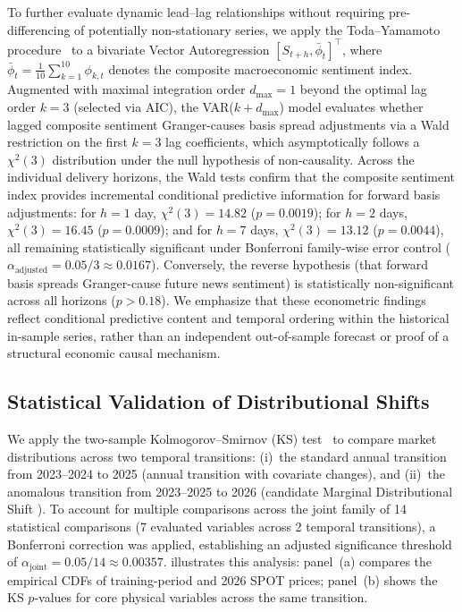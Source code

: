 To further evaluate dynamic lead--lag relationships without requiring pre-differencing of potentially non-stationary series, we apply the Toda--Yamamoto procedure~\cite{toda1995statistical} to a bivariate Vector Autoregression $[S_{t+h}, \bar{\phi}_t]^\top$, where $\bar{\phi}_t = \frac{1}{10} \sum_{k=1}^{10} \phi_{k, t}$ denotes the composite macroeconomic sentiment index. Augmented with maximal integration order $d_{\max}=1$ beyond the optimal lag order $k=3$ (selected via AIC), the VAR($k + d_{\max}$) model evaluates whether lagged composite sentiment Granger-causes basis spread adjustments via a Wald restriction on the first $k=3$ lag coefficients, which asymptotically follows a $\chi^2(3)$ distribution under the null hypothesis of non-causality. Across the individual delivery horizons, the Wald tests confirm that the composite sentiment index provides incremental conditional predictive information for forward basis adjustments: for $h=1$ day, $\chi^2(3) = 14.82$ ($p = 0.0019$); for $h=2$ days, $\chi^2(3) = 16.45$ ($p = 0.0009$); and for $h=7$ days, $\chi^2(3) = 13.12$ ($p = 0.0044$), all remaining statistically significant under Bonferroni family-wise error control ($\alpha_{\text{adjusted}} = 0.05 / 3 \approx 0.0167$). Conversely, the reverse hypothesis (that forward basis spreads Granger-cause future news sentiment) is statistically non-significant across all horizons ($p > 0.18$). We emphasize that these econometric findings reflect conditional predictive content and temporal ordering within the historical in-sample series, rather than an independent out-of-sample forecast or proof of a structural economic causal mechanism.

\subsection{Statistical Validation of Distributional Shifts}
\label{subsec:concept_drift}

We apply the two-sample Kolmogorov--Smirnov (KS) test~\cite{kolmogorov1933,smirnov1948}
to compare market distributions across two temporal transitions:
(i)~the standard annual transition from 2023--2024 to 2025 (annual transition with covariate changes),
and (ii)~the anomalous transition from 2023--2025 to 2026 (candidate Marginal Distributional Shift \cite{tsymbal2004concept}).
To account for multiple comparisons across the joint family of 14 statistical comparisons (7 evaluated variables across 2 temporal transitions), a Bonferroni correction \cite{bonferroni1936teoria, dunn1961multiple} was applied, establishing an adjusted significance threshold of $\alpha_{\text{joint}} = 0.05 / 14 \approx 0.00357$.
 illustrates this analysis: panel~(a) compares the empirical
CDFs of training-period and 2026 SPOT prices; panel~(b) shows the KS $p$-values
for core physical variables across the same transition.

